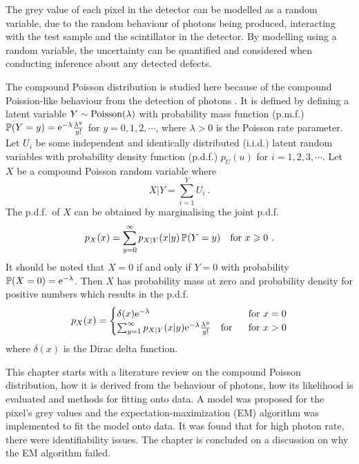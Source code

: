 The grey value of each pixel in the detector can be modelled as a random variable, due to the random behaviour of photons being produced, interacting with the test sample and the scintillator in the detector. By modelling using a random variable, the uncertainty can be quantified and considered when conducting inference about any detected defects.

The compound Poisson distribution is studied here because of the compound Poission-like behaviour from the detection of photons \citep{whiting2002signal, elbakri2003efficient, whiting2006properties}. It is defined by defining a latent variable $Y\sim\operatorname{Poisson}(\lambda)$ with probability mass function (p.m.f.) $\operatorname{\mathbb{P}}(Y=y)=\mathrm{e}^{-\lambda}\frac{\lambda^y}{y!}$ for $y=0,1,2,\cdots$, where $\lambda>0$ is the Poisson rate parameter. Let $U_i$ be some independent and identically distributed (i.i.d.) latent random variables with probability density function (p.d.f.) $p_U(u)$ for $i=1,2,3,\cdots$. Let $X$ be a compound Poisson random variable where
\begin{equation}
  X|Y = \sum_{i=1}^{Y}U_i \ .
  \label{eq:compoundPoisson_X|Y}
\end{equation}
The p.d.f.~of $X$ can be obtained by marginalising the joint p.d.f.
\begin{equation}
  p_X(x)=\sum_{y=0}^\infty p_{X|Y}(x|y)\operatorname{\mathbb{P}}(Y=y) \quad\text{for }x\geqslant 0
  \ .
\end{equation}
It should be noted that $X=0$ if and only if $Y=0$ with probability $\operatorname{\mathbb{P}}(X=0)=\mathrm{e}^{-\lambda}$. Then $X$ has probability mass at zero and probability density for positive numbers which results in the p.d.f.
\begin{equation}
  p_X(x) = 
  \begin{cases}
    \delta(x) \mathrm{e}^{-\lambda}  & \text{ for } x=0 \\ 
    \sum_{y=1}^\infty p_{X|Y}(x|y)\mathrm{e}^{-\lambda}\frac{\lambda^y}{y!} \quad\text{for } & \text{ for } x>0
  \end{cases}
\end{equation}
where $\delta(x)$ is the Dirac delta function.

This chapter starts with a literature review on the compound Poisson distribution, how it is derived from the behaviour of photons, how its likelihood is evaluated and methods for fitting onto data. A model was proposed for the pixel's grey values and the expectation-maximization (EM) algorithm was implemented to fit the model onto data. It was found that for high photon rate, there were identifiability issues. The chapter is concluded on a discussion on why the EM algorithm failed.

